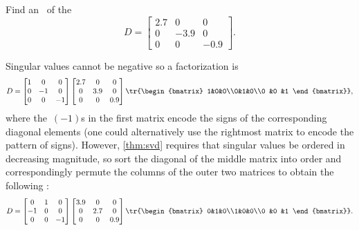 \begin{example}[positive ordering] 
Find an \svd\ of the 
\begin{equation*}
D=\begin{bmatrix} 2.7&0&0\\0&-3.9&0\\0& 0 &-0.9 \end{bmatrix}.
\end{equation*}
\begin{solution} 
Singular values cannot be negative so a factorization is
\begin{equation*}
D=\begin{bmatrix} 1&0&0\\0&-1&0\\0 &0 &-1 \end{bmatrix}
\begin{bmatrix} 2.7&0&0\\0&3.9&0\\0 &0 &0.9 \end{bmatrix}
\tr{\begin{bmatrix} 1&0&0\\0&1&0\\0 &0 &1 \end{bmatrix}},
\end{equation*}
where the~\((-1)\)s in the first matrix encode the signs of the corresponding diagonal elements (one could alternatively use the rightmost matrix to encode the pattern of signs).
However, \cref{thm:svd} requires that  singular values be ordered in decreasing magnitude, so sort the diagonal of the middle matrix into order and correspondingly permute the columns of the outer two matrices to obtain the following \svd: 
\begin{equation*}
D=\begin{bmatrix} 0&1&0\\-1&0&0\\0 &0 &-1 \end{bmatrix}
\begin{bmatrix} 3.9&0&0\\0&2.7&0\\0 &0 &0.9 \end{bmatrix}
\tr{\begin{bmatrix} 0&1&0\\1&0&0\\0 &0 &1 \end{bmatrix}}.
\end{equation*} 
\end{solution}
\end{example}



